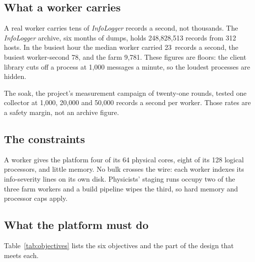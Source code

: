 \subsection{What a worker carries}\label{sec:problem-volumes}

A real worker carries tens of \textit{InfoLogger} records a second, not thousands. The \textit{InfoLogger} archive, six months of dumps, holds 248,828,513 records from 312 hosts. In the busiest hour the median worker carried 23~records a second, the busiest worker-second 78, and the farm 9,781. These figures are floors: the client library cuts off a process at 1,000 messages a minute, so the loudest processes are hidden.

The soak, the project's measurement campaign of twenty-one rounds, tested one collector at 1,000, 20,000 and 50,000 records a second per worker. Those rates are a safety margin, not an archive figure.

\subsection{The constraints}\label{sec:problem-constraints}

A worker gives the platform four of its 64 physical cores, eight of its 128 logical processors, and little memory. No bulk crosses the wire: each worker indexes its info-severity lines on its own disk. Physicists' staging runs occupy two of the three farm workers and a build pipeline wipes the third, so hard memory and processor caps apply.

\subsection{What the platform must do}\label{sec:problem-objectives}

Table~\ref{tab:objectives} lists the six objectives and the part of the design that meets each.

